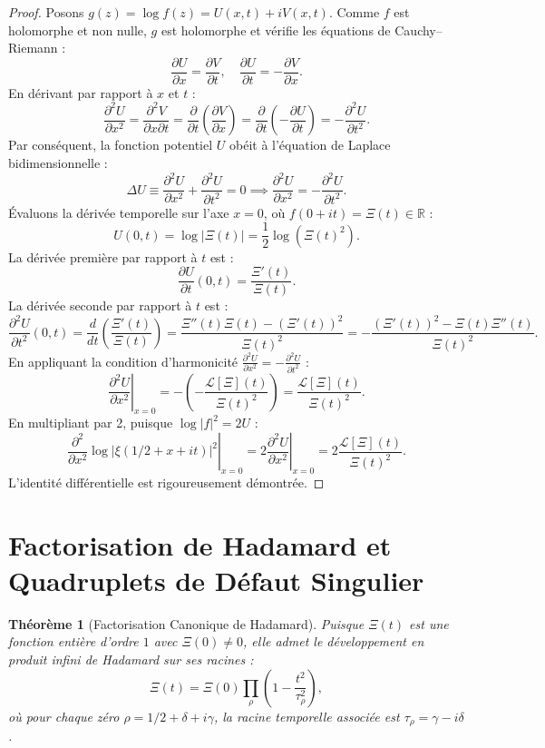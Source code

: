 \documentclass[11pt,a4paper]{article}
\newtheorem{theorem}{Théorème}[section]
\theoremstyle{definition}
\theoremstyle{remark}
\begin{document}
\begin{proof}
Posons $g(z) = \log f(z) = U(x, t) + i V(x, t)$. Comme $f$ est holomorphe et non nulle, $g$ est holomorphe et vérifie les équations de Cauchy--Riemann :
\[
\frac{\partial U}{\partial x} = \frac{\partial V}{\partial t}, \quad \frac{\partial U}{\partial t} = -\frac{\partial V}{\partial x}.
\]
En dérivant par rapport à $x$ et $t$ :
\[
\frac{\partial^2 U}{\partial x^2} = \frac{\partial^2 V}{\partial x \partial t} = \frac{\partial}{\partial t}\left(\frac{\partial V}{\partial x}\right) = \frac{\partial}{\partial t}\left(-\frac{\partial U}{\partial t}\right) = -\frac{\partial^2 U}{\partial t^2}.
\]
Par conséquent, la fonction potentiel $U$ obéit à l'équation de Laplace bidimensionnelle :
\[
\Delta U \equiv \frac{\partial^2 U}{\partial x^2} + \frac{\partial^2 U}{\partial t^2} = 0 \implies \frac{\partial^2 U}{\partial x^2} = -\frac{\partial^2 U}{\partial t^2}.
\]
Évaluons la dérivée temporelle sur l'axe $x = 0$, où $f(0+it) = \Xi(t) \in \mathbb{R}$ :
\[
U(0, t) = \log |\Xi(t)| = \frac{1}{2}\log (\Xi(t)^2).
\]
La dérivée première par rapport à $t$ est :
\[
\frac{\partial U}{\partial t}(0, t) = \frac{\Xi'(t)}{\Xi(t)}.
\]
La dérivée seconde par rapport à $t$ est :
\[
\frac{\partial^2 U}{\partial t^2}(0, t) = \frac{d}{dt}\left(\frac{\Xi'(t)}{\Xi(t)}\right) = \frac{\Xi''(t)\Xi(t) - (\Xi'(t))^2}{\Xi(t)^2} = -\frac{(\Xi'(t))^2 - \Xi(t)\Xi''(t)}{\Xi(t)^2}.
\]
En appliquant la condition d'harmonicité $\frac{\partial^2 U}{\partial x^2} = -\frac{\partial^2 U}{\partial t^2}$ :
\[
\left.\frac{\partial^2 U}{\partial x^2}\right|_{x=0} = -\left(-\frac{\mathcal{L}[\Xi](t)}{\Xi(t)^2}\right) = \frac{\mathcal{L}[\Xi](t)}{\Xi(t)^2}.
\]
En multipliant par 2, puisque $\log |f|^2 = 2U$ :
\[
\left.\frac{\partial^2}{\partial x^2}\log |\xi(1/2 + x + it)|^2\right|_{x=0} = 2 \left.\frac{\partial^2 U}{\partial x^2}\right|_{x=0} = 2 \frac{\mathcal{L}[\Xi](t)}{\Xi(t)^2}.
\]
L'identité différentielle est rigoureusement démontrée.
\end{proof}

\section{Factorisation de Hadamard et Quadruplets de Défaut Singulier}

\begin{theorem}[Factorisation Canonique de Hadamard]
Puisque $\Xi(t)$ est une fonction entière d'ordre $1$ avec $\Xi(0) \neq 0$, elle admet le développement en produit infini de Hadamard sur ses racines :
\begin{equation}
\Xi(t) = \Xi(0) \prod_{\rho} \left(1 - \frac{t^2}{\tau_\rho^2}\right),
\end{equation}
où pour chaque zéro $\rho = 1/2 + \delta + i\gamma$, la racine temporelle associée est $\tau_\rho = \gamma - i\delta$.
\end{theorem}
\end{document}
